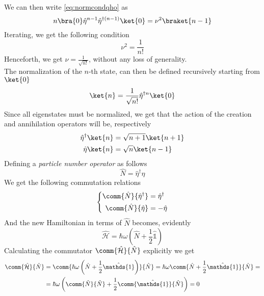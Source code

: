 \documentclass[a4paper, 11pt]{book}
\newcommand{\1}{\opr{\mathds{1}}}
\newcommand{\ham}{\mathcal{H}}
\newcommand{\opr}[1]{\hat{#1}}
\newcommand{\adj}[2][]{#2^{\dagger#1}}
\theoremstyle{plain}
\begin{document}
	We can then write \eqref{eq:normcondqho} as
	\begin{equation*}
		n\bra{0}\opr{\eta}^{n-1}\adj[(n-1)]{\opr{\eta}}\ket{0}=\nu^2\braket{n-1}
	\end{equation*}
	Iterating, we get the following condition
	\begin{equation}
		\nu^2=\frac{1}{n!}
		\label{eq:normcond}
	\end{equation}
	Henceforth, we get $\nu=\frac{1}{\sqrt{n!}}$, without any loss of generality.\\
	The normalization of the $n$-th state, can then be defined recursively starting from $\ket{0}$
	\begin{equation}
		\ket{n}=\frac{1}{\sqrt{n!}}\adj[n]{\opr{\eta}}\ket{0}
		\label{eq:qhoeigenstates}
	\end{equation}
	Since all eigenstates must be normalized, we get that the action of the creation and annihilation operators will be, respectively
	\begin{equation}
		\begin{aligned}
			\adj{\opr{\eta}}\ket{n}&=\sqrt{n+1}\ket{n+1}\\
			\opr{\eta}\ket{n}&=\sqrt{n}\ket{n-1}
		\end{aligned}
		\label{eq:annihilationcreationaction}
	\end{equation}
	Defining a \textit{particle number operator} as follows
	\begin{equation}
		\opr{N}=\adj{\opr{\eta}}\opr{\eta}
		\label{eq:numberoperatordef}
	\end{equation}
	We get the following commutation relations
	\begin{equation}
		\left\{ \begin{aligned}
				\comm{\opr{N}}{\adj{\opr{\eta}}}&=\adj{\opr{\eta}}\\
				\comm{\opr{N}}{\opr{\eta}}&=-\opr{\eta}
		\end{aligned}\right.
		\label{eq:ncommrel}
	\end{equation}
	And the new Hamiltonian in terms of $\opr{N}$ becomes, evidently
	\begin{equation}
		\opr{\ham}=\hbar\omega\left( \opr{N}+\frac{1}{2}\1 \right)
		\label{eq:numberopham}
	\end{equation}
	Calculating the commutator $\comm{\opr{\ham}}{\opr{N}}$ explicitly we get
	\begin{equation}
		\begin{aligned}
			\comm{\opr{\ham}}{\opr{N}}&=\comm{\hbar\omega\left( \opr{N}+\frac{1}{2}\1 \right)}{\opr{N}}=\hbar\omega\comm{\opr{N}+\frac{1}{2}\1}{\opr{N}}=\\
			&=\hbar\omega\left( \comm{\opr{N}}{\opr{N}}+\frac{1}{2}\comm{\1}{\opr{N}} \right)=0
		\end{aligned}
		\label{eq:hamnumbercomm}
	\end{equation}
\end{document}
